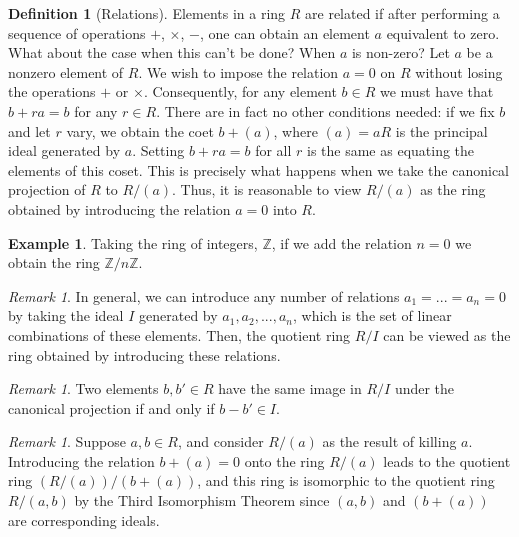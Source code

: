 \documentclass[12pt]{article}
\theoremstyle{definition}
\newtheorem{defn}[thm]{Definition}
\newtheorem{eg}[thm]{Example}
\theoremstyle{remark}
\newtheorem{rmk}[thm]{Remark}
\numberwithin{equation}{section}
\newcommand\Z{\mathbb Z}    %
\begin{document}
\vspace{15pt}


\begin{defn}[Relations]
        Elements in a ring $R$ are related if after performing a sequence of operations $+$, $\times$, $-$, one can obtain an element $a$ equivalent to zero. What about the case when this can't be done? When $a$ is non-zero? Let $a$ be a nonzero element of $R$. We wish to impose the relation $a = 0$ on $R$ without losing the operations $+$ or $\times$. Consequently, for any element $b \in R$ we must have that $b + ra = b$ for any $r \in R$. There are in fact no other conditions needed: if we fix $b$ and let $r$ vary, we obtain the coet $b +(a)$, where $(a) =aR$ is the principal ideal generated by $a$. Setting $b+ra=b$ for all $r$ is the same as equating the elements of this coset. This is precisely what happens when we take the canonical projection of $R$ to $R/(a)$. Thus, it is reasonable to view $R/(a)$ as the ring obtained by introducing the relation $a=0$ into $R$.
\end{defn}

\vspace{15pt}

\begin{eg}
        Taking the ring of integers, $\Z$, if we add the relation $n = 0$ we obtain the ring $\Z/n\Z$.
\end{eg}

\vspace{15pt}

\begin{rmk}
        In general, we can introduce any number of relations $a_1=...=a_n=0$ by taking the ideal $I$ generated by $a_1,a_2,...,a_n$, which is the set of linear combinations of these elements. Then, the quotient ring $R/I$ can be viewed as the ring obtained by introducing these relations.
\end{rmk}


\vspace{15pt}

\begin{rmk}
        Two elements $b,b' \in R$ have the same image in $R/I$ under the canonical projection if and only if $b-b' \in I$.
\end{rmk}

\vspace{15pt}

\begin{rmk}
        Suppose $a,b \in R$, and consider $R/(a)$ as the result of killing $a$. Introducing the relation $b+(a) = 0$ onto the ring $R/(a)$ leads to the quotient ring $(R/(a))/(b+(a))$, and this ring is isomorphic to the quotient ring $R/(a,b)$ by the Third Isomorphism Theorem since $(a,b)$ and $(b+(a))$ are corresponding ideals.
\end{rmk}
\end{document}
